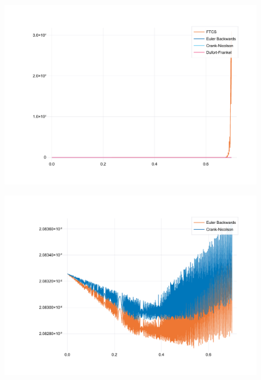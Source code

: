 \documentclass[
	a4paper, %
	10pt, %
]{CSUniSchoolLabReport}
\begin{document}
\begin{figure}[H]
	\centering
	\includegraphics[width=\textwidth]{../saves_t2/error_comp.pdf}
	\caption{}
\end{figure}


\begin{figure}[H]
	\centering
	\includegraphics[width=\textwidth]{../saves_t2/error_comp_be_cn.pdf}
	\caption{}
\end{figure}
\end{document}
